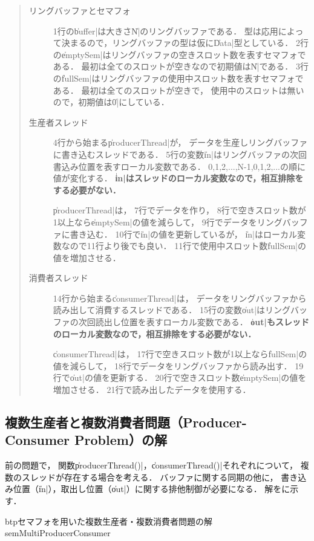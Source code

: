 \begin{quote}
\begin{description}
\item [リングバッファとセマフォ]
1行の\|buffer|は大きさ\|N|のリングバッファである．
型は応用によって決まるので，リングバッファの型は仮に\|Data|型としている．
2行の\|emptySem|はリングバッファの空きスロット数を表すセマフォである．
最初は全てのスロットが空きなので初期値は\|N|である．
3行の\|fullSem|はリングバッファの使用中スロット数を表すセマフォである．
最初は全てのスロットが空きで，
使用中のスロットは無いので，初期値は\|0|にしている．

\item [生産者スレッド]
4行から始まる\|producerThread|が，
データを生産しリングバッファに書き込むスレッドである．
5行の変数\|in|はリングバッファの次回書込み位置を表すローカル変数である．
0,1,2,...,N-1,0,1,2,...の順に値が変化する．
{\bf \|in|はスレッドのローカル変数なので，相互排除をする必要がない．}

\|producerThread|は，
7行でデータを作り，
8行で空きスロット数が1以上なら\|emptySem|の値を減らして，
9行でデータをリングバッファに書き込む．
10行で\|in|の値を更新しているが，
\|in|はローカル変数なので11行より後でも良い．
11行で使用中スロット数\|fullSem|の値を増加させる．

\item [消費者スレッド]
14行から始まる\|consumerThread|は，
データをリングバッファから読み出して消費するスレッドである．
15行の変数\|out|はリングバッファの次回読出し位置を表すローカル変数である．
{\bf \|out|もスレッドのローカル変数なので，相互排除をする必要がない．}

\|consumerThread|は，
17行で空きスロット数が1以上なら\|fullSem|の値を減らして，
18行でデータをリングバッファから読み出す．
19行で\|out|の値を更新する．
20行で空きスロット数\|emptySem|の値を増加させる．
21行で読み出したデータを使用する．
\end{description}
\end{quote}

\subsection{複数生産者と複数消費者問題（Producer-Consumer Problem）の解}
前の問題で，
関数\|producerThread()|，\|consumerThread()|それぞれについて，
複数のスレッドが存在する場合を考える．
バッファに関する同期の他に，
書き込み位置（\|in|），取出し位置（\|out|）に関する排他制御が必要になる．
解をに示す．

\begin{myfig}{btp}{セマフォを用いた複数生産者・複数消費者問題の解}
{semMultiProducerConsumer}

\end{myfig}


